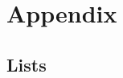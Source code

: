 \documentclass  [
  paper    = a4,
  BCOR     = 10mm,
  twoside,
  fontsize = 12pt,
  fleqn,
  toc      = bibnumbered,
  toc      = listofnumbered,
  numbers  = noendperiod,
  headings = normal,
  listof   = leveldown,
  version  = 3.03
]                                       {scrreprt}
\newcommand{\<}{\langle}
\renewcommand{\>}{\rangle}
\begin{document}
   
   
   
   
   
   
   
   \newpage
  \part{Appendix}
  \begin{appendix}
    \chapter{Lists}
    {}
    
    
  \end{appendix}
\end{document}
